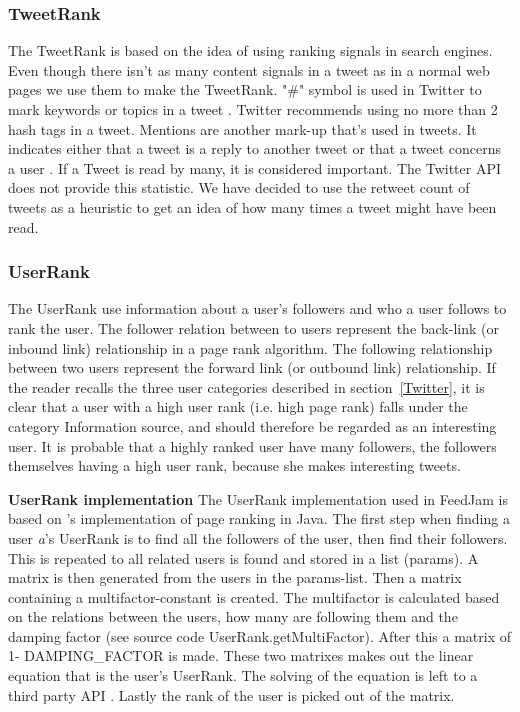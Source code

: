 \subsubsection{TweetRank}
The TweetRank is based on the idea of using ranking signals in search engines. Even though there isn't as many content signals in a tweet as in a normal web pages we use them to make the TweetRank. "\#" symbol is used in Twitter to mark keywords or topics in a tweet \citep{Twitter}. Twitter recommends using no more than 2 hash tags in a tweet. 
Mentions are another mark-up that's used in tweets. It indicates either that a tweet is a reply to another tweet or that a tweet concerns a user \citep{Twitterb}. If a Tweet is read by many, it is considered important. The Twitter API does not provide this statistic. We have decided to use the retweet count of tweets as a heuristic to get an idea of how many times a tweet might have been read.

\subsubsection{UserRank}
The UserRank use information about a user's followers and who a user follows to rank the user. The follower relation between to users represent the back-link (or inbound link) relationship in a page rank algorithm. The following relationship between two users represent the forward link (or outbound link) relationship. If the reader recalls the three user categories described in section~\ref{Twitter}, it is clear that a user with a high user rank (i.e. high page rank) falls under the category Information source, and should therefore be regarded as an interesting user. It is probable that a highly ranked user have many followers, the followers themselves having a high user rank, because she makes interesting tweets.

{\bf UserRank implementation}\newline
The UserRank implementation used in FeedJam is based on \citet{Goodrarzi2009}'s implementation of page ranking in Java. The first step when finding a user \emph{a}'s UserRank is to find all the followers of the user, then find their followers. This is repeated to all related users is found and stored in a list (params). A matrix is then generated from the users in the params-list. Then a matrix containing a multifactor-constant is created. The multifactor is calculated based on the relations between the users, how many are following them and the damping factor (see source code UserRank.getMultiFactor). After this a matrix of 1- DAMPING\_FACTOR is made. These two matrixes makes out the linear equation that is the user's UserRank. The solving of the equation is left to a third party API \citep{Jama}. Lastly the rank of the user is picked out of the matrix.

